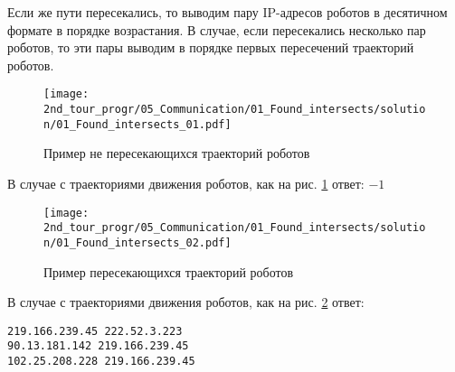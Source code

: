 Если же пути пересекались, то выводим пару IP-адресов роботов в десятичном формате в порядке возрастания. В случае, если пересекались несколько пар роботов, то эти пары выводим в порядке первых пересечений траекторий роботов.\\

\begin{figure}[h!]
	\centering
	\texttt{[image: 2nd\_tour\_progr/05\_Communication/01\_Found\_intersects/solution/01\_Found\_intersects\_01.pdf]}
	\caption{Пример не пересекающихся траекторий роботов}
	\label{fig:01_Found_intersects_01}
\end{figure}

В случае с траекториями движения роботов, как на рис. \ref{fig:01_Found_intersects_01} ответ: $-1$


\begin{figure}[h!]
	\centering
	\texttt{[image: 2nd\_tour\_progr/05\_Communication/01\_Found\_intersects/solution/01\_Found\_intersects\_02.pdf]}
	\caption{Пример пересекающихся траекторий роботов}
	\label{fig:01_Found_intersects_02}
\end{figure}

В случае с траекториями движения роботов, как на рис. \ref{fig:01_Found_intersects_02} ответ: \\

\begin{verbatim}
219.166.239.45 222.52.3.223
90.13.181.142 219.166.239.45
102.25.208.228 219.166.239.45
\end{verbatim}


\codeExample

